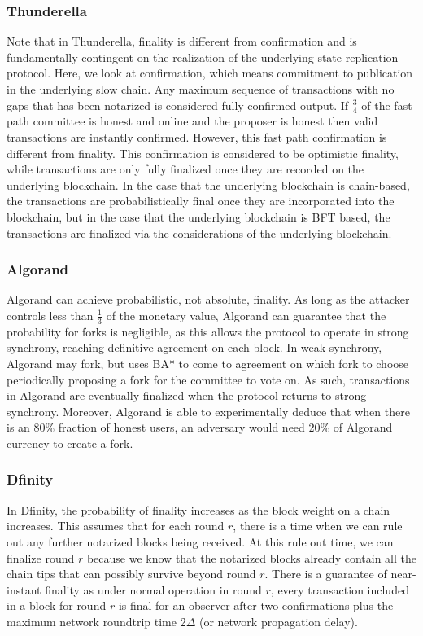 \documentclass[10pt,journal,compsoc]{IEEEtran}
\begin{document}
\subsubsection{Thunderella} Note that in Thunderella, finality is different from confirmation and is fundamentally contingent on the realization of the underlying state replication protocol. Here, we look at confirmation, which means commitment to publication in the underlying slow chain. Any maximum sequence of transactions with no gaps that has been notarized is considered fully confirmed output. If \(\frac{3}{4}\) of the fast-path committee is honest and online and the proposer is honest then valid transactions are instantly confirmed. However, this fast path confirmation is different from finality. This confirmation is considered to be optimistic finality, while transactions are only fully finalized once they are recorded on the underlying blockchain. In the case that the underlying blockchain is chain-based, the transactions are probabilistically final once they are incorporated into the blockchain, but in the case that the underlying blockchain is BFT based, the transactions are finalized via the considerations of the underlying blockchain.

\subsubsection{Algorand} Algorand can achieve probabilistic, not absolute, finality. As long as the attacker controls less than \(\frac{1}{3}\) of the monetary value, Algorand can guarantee that the probability for forks is negligible, as this allows the protocol to operate in strong synchrony, reaching definitive agreement on each block. In weak synchrony, Algorand may fork, but uses BA* to come to agreement on which fork to choose periodically proposing a fork for the committee to vote on. As such, transactions in Algorand are eventually finalized when the protocol returns to strong synchrony. Moreover, Algorand is able to experimentally deduce that when there is an 80\% fraction of honest users, an adversary would need 20\% of Algorand currency to create a fork.

\subsubsection{Dfinity}
In Dfinity, the probability of finality increases as the block weight on a chain increases. This assumes that for each round $r$, there is a time when we can rule out any further notarized blocks being received. At this rule out time, we can finalize round $r$ because we know that the notarized blocks already contain all the chain tips that can possibly survive beyond round $r$. There is a guarantee of near-instant finality as under normal operation in round $r$, every transaction included in a block for round $r$ is final for an observer after two confirmations plus the maximum network roundtrip time 2$\Delta$ (or network propagation delay).  
\end{document}
